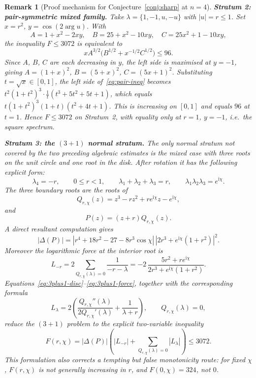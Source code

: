 \documentclass[11pt]{article}
\newtheorem{remark}[theorem]{Remark}
\numberwithin{equation}{section}
\newcommand{\ii}{\mathrm i}
\begin{document}
\begin{remark}[Proof mechanism for Conjecture~\ref{conj:sharp} at $n=4$]
\smallskip
\noindent\textbf{Stratum 2: pair-symmetric mixed family.}
Take $\lambda=\{1,-1,u,-u\}$ with $|u|=r\le1$.  Set $x=r^2$,
$y=\cos(2\arg u)$.  With
\[
  A=1+x^2-2xy,\quad B=25+x^2-10xy,\quad C=25x^2+1-10xy,
\]
the inequality $F\le3072$ is equivalent to
\begin{equation}\label{eq:pair-ineq}
  xA^{3/2}\bigl(B^{1/2}+x^{-1/2}C^{1/2}\bigr)\le96.
\end{equation}
Since $A$, $B$, $C$ are each decreasing in $y$, the left side is maximised
at $y=-1$, giving $A=(1+x)^2$, $B=(5+x)^2$, $C=(5x+1)^2$.
Substituting $t=\sqrt{x}\in[0,1]$, the left side of~\eqref{eq:pair-ineq}
becomes $t^2(1+t^2)^3\cdot\tfrac{1}{t}(t^3+5t^2+5t+1)$, which equals
$t(1+t^2)^3(1+t)(t^2+4t+1)$.
This is increasing on $[0,1]$ and equals $96$ at $t=1$.
Hence $F\le3072$ on Stratum~2, with equality only at $r=1$, $y=-1$, i.e.\
the square spectrum.

\smallskip
\noindent\textbf{Stratum 3: the $(3{+}1)$ normal stratum.}
The only normal stratum not covered by the two preceding algebraic estimates is
the mixed case with three roots on the unit circle and one root in the disk.
After rotation it has the following explicit form:
\[
  \lambda_4=-r,\qquad 0\le r<1,\qquad
  \lambda_1+\lambda_2+\lambda_3=r,\qquad
  \lambda_1\lambda_2\lambda_3=e^{\ii\chi}.
\]
The three boundary roots are the roots of
\[
  Q_{r,\chi}(z)=z^3-rz^2+re^{\ii\chi}z-e^{\ii\chi},
\]
and
\[
  P(z)=(z+r)Q_{r,\chi}(z).
\]
A direct resultant computation gives
\begin{equation}\label{eq:3plus1-disc}
  |\Delta(P)|
  =
  |r^4+18r^2-27-8r^3\cos\chi|\,
  |2r^3+e^{\ii\chi}(1+r^2)|^2 .
\end{equation}
Moreover the logarithmic force at the interior root is
\begin{equation}\label{eq:3plus1-force}
  L_{-r}
  =
  2\sum_{Q_{r,\chi}(\lambda)=0}\frac{1}{-r-\lambda}
  =
  -2\,\frac{5r^2+re^{\ii\chi}}
  {2r^3+e^{\ii\chi}(1+r^2)} .
\end{equation}
Equations~\eqref{eq:3plus1-disc}--\eqref{eq:3plus1-force}, together with
the corresponding formula
\[
  L_\lambda=
  2\left(\frac{Q_{r,\chi}''(\lambda)}{2Q_{r,\chi}'(\lambda)}
  +\frac{1}{\lambda+r}\right),
  \qquad Q_{r,\chi}(\lambda)=0,
\]
reduce the $(3{+}1)$ problem to the explicit two-variable inequality
\[
  F(r,\chi)=|\Delta(P)|\left(|L_{-r}|+
  \sum_{Q_{r,\chi}(\lambda)=0}|L_\lambda|\right)\le3072.
\]
This formulation also corrects a tempting but false monotonicity route:
for fixed $\chi$, $F(r,\chi)$ is not generally increasing in $r$, and
$F(0,\chi)=324$, not $0$.


\end{remark}
\end{document}
